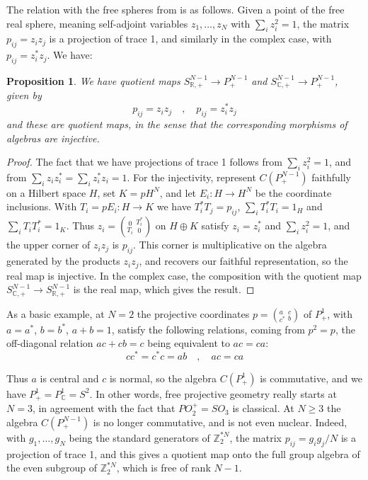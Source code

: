 \documentclass[11pt]{article}
\theoremstyle{plain}
\newtheorem{proposition}[theorem]{Proposition}
\begin{document}
\bigskip

The relation with the free spheres from \cite{ba1} is as follows. Given a point of the free real sphere, meaning self-adjoint variables $z_1,\ldots,z_N$ with $\sum_iz_i^2=1$, the matrix $p_{ij}=z_iz_j$ is a projection of trace 1, and similarly in the complex case, with $p_{ij}=z_i^*z_j$. We have:

\begin{proposition}
We have quotient maps $S^{N-1}_{\mathbb R,+}\to P^{N-1}_+$ and $S^{N-1}_{\mathbb C,+}\to P^{N-1}_+$, given by
$$p_{ij}=z_iz_j\quad,\quad p_{ij}=z_i^*z_j$$
and these are quotient maps, in the sense that the corresponding morphisms of algebras are injective.
\end{proposition}

\begin{proof}
The fact that we have projections of trace 1 follows from $\sum_iz_i^2=1$, and from $\sum_iz_iz_i^*=\sum_iz_i^*z_i=1$. For the injectivity, represent $C(P^{N-1}_+)$ faithfully on a Hilbert space $H$, set $K=pH^N$, and let $E_i:H\to H^N$ be the coordinate inclusions. With $T_i=pE_i:H\to K$ we have $T_i^*T_j=p_{ij}$, $\sum_iT_i^*T_i=1_H$ and $\sum_iT_iT_i^*=1_K$. Thus $z_i=(^{\ 0\ }_{T_i}{\ }^{T_i^*}_{\ 0\ })$ on $H\oplus K$ satisfy $z_i=z_i^*$ and $\sum_iz_i^2=1$, and the upper corner of $z_iz_j$ is $p_{ij}$. This corner is multiplicative on the algebra generated by the products $z_iz_j$, and recovers our faithful representation, so the real map is injective. In the complex case, the composition with the quotient map $S^{N-1}_{\mathbb C,+}\to S^{N-1}_{\mathbb R,+}$ is the real map, which gives the result.
\end{proof}

As a basic example, at $N=2$ the projective coordinates $p=(^a_{c^*}{\ }^c_b)$ of $P^1_+$, with $a=a^*$, $b=b^*$, $a+b=1$, satisfy the following relations, coming from $p^2=p$, the off-diagonal relation $ac+cb=c$ being equivalent to $ac=ca$:
$$cc^*=c^*c=ab\quad,\quad ac=ca$$

Thus $a$ is central and $c$ is normal, so the algebra $C(P^1_+)$ is commutative, and we have $P^1_+=P^1_\mathbb C=S^2$. In other words, free projective geometry really starts at $N=3$, in agreement with the fact that $PO_2^+=SO_3$ is classical. At $N\geq3$ the algebra $C(P^{N-1}_+)$ is no longer commutative, and is not even nuclear. Indeed, with $g_1,\ldots,g_N$ being the standard generators of $\mathbb Z_2^{*N}$, the matrix $p_{ij}=g_ig_j/N$ is a projection of trace 1, and this gives a quotient map onto the full group algebra of the even subgroup of $\mathbb Z_2^{*N}$, which is free of rank $N-1$.
\end{document}

